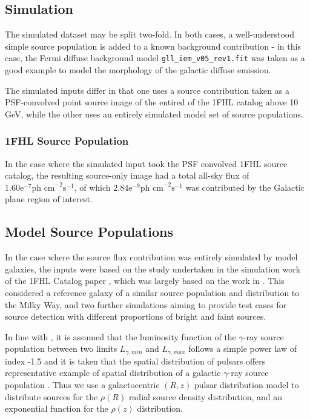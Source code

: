 \documentclass{PoS}
\begin{document}
\subsection{Simulation}

The simulated dataset may be split two-fold. In both cases, a well-understood simple source population is added to a known background contribution - in this case, the Fermi diffuse background model \verb|gll_iem_v05_rev1.fit| was taken as a good example to model the morphology of the galactic diffuse emission.

The simulated inputs differ in that one uses a source contribution taken as a PSF-convolved point source image of the entired of the 1FHL catalog above 10 GeV, while the other uses an entirely simulated model set of source populations.

\subsubsection{1FHL Source Population}

In the case where the simulated input took the PSF convolved 1FHL source catalog, the resulting source-only image had a total all-sky flux of $1.60\text{e}^{-7} \text{ph cm}^{-2}\text{s}^{-1}$, of which $2.84\text{e}^{-9} \text{ph cm}^{-2}\text{s}^{-1}$ was contributed by the Galactic plane region of interest.

\subsection{Model Source Populations}

In the case where the source flux contribution was entirely simulated by model galaxies, the inputs were based on the study undertaken in the simulation work of the 1FHL Catalog paper \cite[p.59]{1fhl}, which was largely based on the work in \cite{Strong}. This considered a reference galaxy of a similar source population and distribution to the Milky Way, and two further simulations aiming to provide test cases for source detection with different proportions of bright and faint sources.

In line with \cite{Strong}, it is assumed that the luminosity function of the $\gamma$-ray source population between two limits $L_{\gamma, min}$ and $L_{\gamma, max}$ follows a simple power law of index -1.5 and it is taken that the spatial distribution of pulsars offers representative example of spatial distribution of a galactic $\gamma$-ray source population \cite[p.2]{Strong}. Thus we use a galactocentric $(R, z)$ pulsar distribution model \cite[p.7]{Lorimer} to distribute sources for the $\rho(R)$ radial source density distribution, and an exponential function for the $\rho(z)$ distribution.
\end{document}
